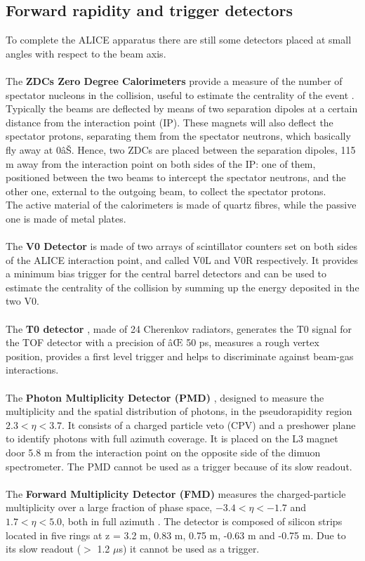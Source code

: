 \subsection{Forward rapidity and trigger detectors}
To complete the ALICE apparatus there are still some detectors placed at small angles with respect to the beam  axis.
\\
\\
The \textbf{ZDCs Zero Degree Calorimeters} provide a measure of the number of spectator nucleons in the collision, useful to estimate the centrality of the event \cite{ZDC-TDR}. Typically the beams are deflected by means of two separation dipoles at a certain distance from the interaction point (IP). These magnets will also deflect the spectator protons, separating them from the spectator neutrons, which basically fly away at 0âŠ. Hence, two ZDCs are placed between the separation dipoles, 115 m away from the interaction point on both sides of the IP: one of them, positioned between the two beams to intercept the spectator neutrons, and the other one, external to the outgoing beam, to collect the spectator protons. \\The active material of the calorimeters is made of quartz fibres, while the passive one is made of metal plates.
\\
\\
The \textbf{V0 Detector} \cite{V0T0-TDR} is made of two arrays of scintillator counters set on both sides of the ALICE interaction point, and called V0L and V0R respectively. It provides a minimum bias trigger for the central barrel detectors and can be used to estimate the centrality of the collision by summing up the energy deposited in the two V0.
\\
\\
The \textbf{T0 detector} \cite{V0T0-TDR}, made of 24 Cherenkov radiators, generates the T0 signal for the TOF detector with a precision of âŒ 50 ps, measures a rough vertex position, provides a first level trigger and helps to discriminate against beam-gas interactions.
\\
\\
The \textbf{Photon Multiplicity Detector (PMD)} \cite{PMD-TDR}, designed to measure the multiplicity and the spatial distribution of photons, in the pseudorapidity region $ 2.3 < \eta < 3.7$. It consists of a charged particle veto (CPV) and a preshower plane to identify photons with full azimuth coverage. It is placed on the L3 magnet door 5.8 m from the interaction point on the opposite side of the dimuon spectrometer. The PMD cannot be used as a trigger because of its slow readout.
\\
\\
The \textbf{Forward Multiplicity Detector (FMD)} measures the charged-particle multiplicity over a large fraction of phase space, $-3.4 < \eta < -1.7$ and $1.7 < \eta < 5.0$, both in full azimuth \cite{V0T0-TDR}. The detector is composed of silicon strips located in five rings at z = 3.2 m, 0.83 m, 0.75 m, -0.63 m and -0.75 m. Due to its slow readout ($>$ 1.2 $\mu$s) it cannot be used as a trigger.

